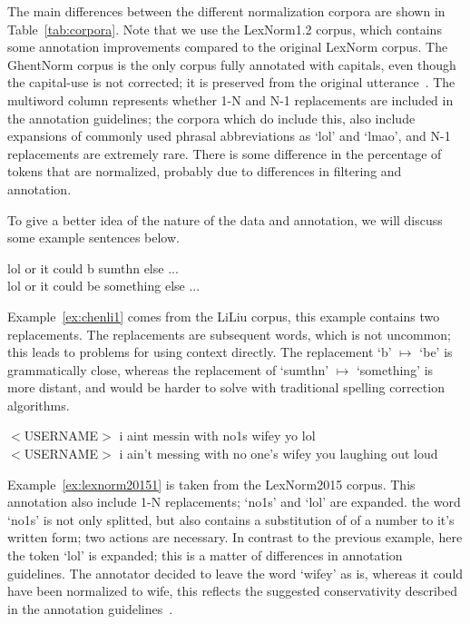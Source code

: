 \documentclass[a4paper,10pt,twoside]{article}
\begin{document}
The main differences between the different normalization corpora are shown in
Table~\ref{tab:corpora}.  Note that we use the LexNorm1.2 corpus, which contains
some annotation improvements compared to the original LexNorm corpus.
The GhentNorm corpus is the only corpus fully
annotated with capitals, even though the capital-use is not corrected; it is
preserved from the original utterance~\cite{DECLERCQ14}. The multiword
column represents whether 1-N and N-1 replacements are included in the
annotation guidelines; the corpora which do include this, also include
expansions of commonly used phrasal abbreviations as `lol' and `lmao', and N-1
replacements are extremely rare.  There is some difference in the percentage of
tokens that are normalized, probably due to differences in filtering and
annotation.

To give a better idea of the nature of the data and annotation, we will 
discuss some example sentences below.

\begin{exe}
    \ex \gll lol or it could b sumthn else ... \\
    lol or it could be something else ... \\
    \label{ex:chenli1}
\end{exe}

Example~\ref{ex:chenli1} comes from the LiLiu corpus, this example contains two
replacements. The replacements are subsequent words, which is not uncommon;
this leads to problems for using context directly. The replacement `b'
$\mapsto$ `be' is grammatically close, whereas the replacement of `sumthn'
$\mapsto$ `something' is more distant, and would be harder to solve with
traditional spelling correction algorithms.

\begin{exe}
    \ex \gll $<$USERNAME$>$ i aint messin with no1s wifey yo lol \\
    $<$USERNAME$>$ i ain't messing with {no one's} wifey you {laughing out loud} \\
    \label{ex:lexnorm20151}
\end{exe}

Example~\ref{ex:lexnorm20151} is taken from the LexNorm2015 corpus. This
annotation also include 1-N replacements; `no1s' and `lol' are expanded. the
word `no1s' is not only splitted, but also contains a substitution of of a
number to it's written form; two actions are necessary. In contrast to the
previous example, here the token `lol' is expanded; this is a matter of
differences in annotation guidelines.  The annotator decided to leave the word
`wifey' as is, whereas it could have been normalized to wife, this reflects the
suggested conservativity described in the annotation
guidelines~\cite{lexnorm2015guidelines}.
\end{document}
